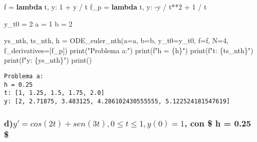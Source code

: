 \documentclass[
  letterpaper,
  DIV=11,
  numbers=noendperiod]{scrartcl}
\newenvironment{Shaded}{\begin{snugshade}}{\end{snugshade}}
\newcommand{\BuiltInTok}[1]{\textcolor[rgb]{0.00,0.23,0.31}{#1}}
\newcommand{\DecValTok}[1]{\textcolor[rgb]{0.68,0.00,0.00}{#1}}
\newcommand{\KeywordTok}[1]{\textcolor[rgb]{0.00,0.23,0.31}{\textbf{#1}}}
\newcommand{\NormalTok}[1]{\textcolor[rgb]{0.00,0.23,0.31}{#1}}
\newcommand{\OperatorTok}[1]{\textcolor[rgb]{0.37,0.37,0.37}{#1}}
\newcommand{\SpecialCharTok}[1]{\textcolor[rgb]{0.37,0.37,0.37}{#1}}
\newcommand{\SpecialStringTok}[1]{\textcolor[rgb]{0.13,0.47,0.30}{#1}}
\newcommand{\StringTok}[1]{\textcolor[rgb]{0.13,0.47,0.30}{#1}}
\begin{document}
\begin{Shaded}
\begin{Highlighting}[]
\NormalTok{f }\OperatorTok{=} \KeywordTok{lambda}\NormalTok{ t, y: }\DecValTok{1} \OperatorTok{+}\NormalTok{ y }\OperatorTok{/}\NormalTok{ t}
\NormalTok{f\_p }\OperatorTok{=} \KeywordTok{lambda}\NormalTok{ t, y: }\OperatorTok{{-}}\NormalTok{y }\OperatorTok{/}\NormalTok{ t}\OperatorTok{**}\DecValTok{2} \OperatorTok{+} \DecValTok{1} \OperatorTok{/}\NormalTok{ t}

\NormalTok{y\_t0 }\OperatorTok{=} \DecValTok{2}
\NormalTok{a }\OperatorTok{=} \DecValTok{1}
\NormalTok{b }\OperatorTok{=} \DecValTok{2}

\NormalTok{ys\_nth, ts\_nth, h }\OperatorTok{=}\NormalTok{ ODE\_euler\_nth(a}\OperatorTok{=}\NormalTok{a, b}\OperatorTok{=}\NormalTok{b, y\_t0}\OperatorTok{=}\NormalTok{y\_t0, f}\OperatorTok{=}\NormalTok{f, N}\OperatorTok{=}\DecValTok{4}\NormalTok{, f\_derivatives}\OperatorTok{=}\NormalTok{[f\_p])}
\BuiltInTok{print}\NormalTok{(}\StringTok{"Problema a:"}\NormalTok{)}
\BuiltInTok{print}\NormalTok{(}\SpecialStringTok{f"h = }\SpecialCharTok{\{}\NormalTok{h}\SpecialCharTok{\}}\SpecialStringTok{"}\NormalTok{)}
\BuiltInTok{print}\NormalTok{(}\SpecialStringTok{f"t: }\SpecialCharTok{\{}\NormalTok{ts\_nth}\SpecialCharTok{\}}\SpecialStringTok{"}\NormalTok{)}
\BuiltInTok{print}\NormalTok{(}\SpecialStringTok{f"y: }\SpecialCharTok{\{}\NormalTok{ys\_nth}\SpecialCharTok{\}}\SpecialStringTok{"}\NormalTok{)}
\BuiltInTok{print}\NormalTok{()}
\end{Highlighting}
\end{Shaded}

\begin{verbatim}
Problema a:
h = 0.25
t: [1, 1.25, 1.5, 1.75, 2.0]
y: [2, 2.71875, 3.483125, 4.286102430555555, 5.122524181547619]
\end{verbatim}

\subsubsection{\texorpdfstring{d)\(y' = cos(2t)+sen(3t), 0 \leq t \leq 1 ,  y(0) = 1\),
con \$ h = 0.25
\$}{d)y\textquotesingle{} = cos(2t)+sen(3t), 0 \textbackslash leq t \textbackslash leq 1 ,  y(0) = 1, con \$ h = 0.25 \$}}\label{dy-cos2tsen3t-0-leq-t-leq-1-y0-1-con-h-0.25}
\end{document}
